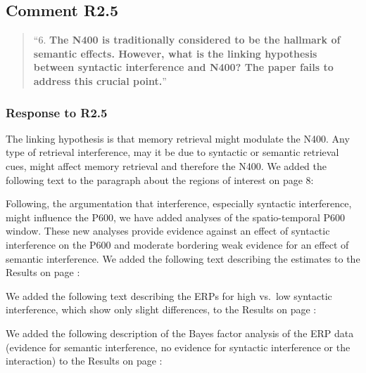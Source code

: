 \documentclass[12pt]{article}
\begin{document}
\begin{quote}
\end{quote}

\subsection*{Comment R2.5}
\begin{quote}
``6. \textbf{The N400 is traditionally considered to be the hallmark of semantic effects. However, what is the linking hypothesis between syntactic interference and N400? The paper fails to address this crucial point.}''
\end{quote}

\subsubsection*{Response to R2.5}
The linking hypothesis is that memory retrieval might modulate the N400. Any type of retrieval interference, may it be due to syntactic or semantic retrieval cues, might affect memory retrieval and therefore the N400. We added the following text to the paragraph about the regions of interest on page 8:

\begin{quote}
\end{quote}

\vspace{1em}
\noindent Following, the argumentation that interference, especially syntactic interference, might influence the P600, we have added analyses of the spatio-temporal P600 window. These new analyses provide evidence against an effect of syntactic interference on the P600 and moderate bordering weak evidence for an effect of semantic interference. We added the following text describing the estimates to the Results on page \pageref{ERP_results1}:

\begin{quote}
\end{quote}

\noindent We added the following text describing the ERPs for high vs.\ low syntactic interference, which show only slight differences, to the Results on page \pageref{ERP_results2}:

\begin{quote}
\end{quote}

\noindent We added the following description of the Bayes factor analysis of the ERP data (evidence for semantic interference, no evidence for syntactic interference or the interaction) to the Results on page \pageref{ERP_results3}:
\end{document}

